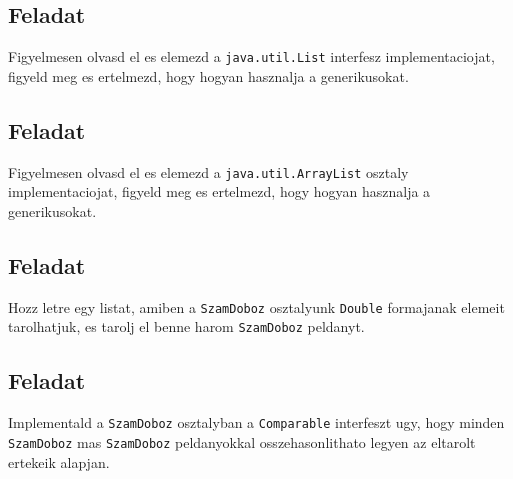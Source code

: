 \documentclass{article}
\let\l\lstinline
\begin{document}
\subsection{Feladat}

Figyelmesen olvasd el es elemezd a \l{java.util.List} interfesz implementaciojat, figyeld meg es ertelmezd, hogy hogyan hasznalja a generikusokat.

\subsection{Feladat}

Figyelmesen olvasd el es elemezd a \l{java.util.ArrayList} osztaly implementaciojat, figyeld meg es ertelmezd, hogy hogyan hasznalja a generikusokat.

\subsection{Feladat}

Hozz letre egy listat, amiben a \l{SzamDoboz} osztalyunk \l{Double} formajanak elemeit tarolhatjuk, es tarolj el benne harom \l{SzamDoboz} peldanyt.

\subsection{Feladat}

Implementald a \l{SzamDoboz} osztalyban a \l{Comparable} interfeszt ugy, hogy minden \l{SzamDoboz} mas \l{SzamDoboz} peldanyokkal osszehasonlithato legyen az eltarolt ertekeik alapjan.
\end{document}
